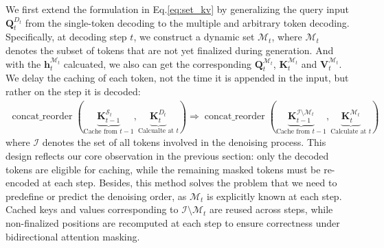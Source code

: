 \documentclass{article}
\newcommand{\bq}{\mathbf{Q}}
\begin{document}
We first extend the formulation in Eq.\ref{eq:set_kv} by generalizing the query input $\bq_t^{D_t}$ from the single-token decoding to the multiple and arbitrary token decoding. Specifically, at decoding step $t$, we construct a dynamic set $\mathcal{M}_t$, where $\mathcal{M}_t$ denotes the subset of tokens that are not yet finalized during generation. 
And with the $\mathbf{h}_t^{\mathcal{M}_t}$ calcuated, we also can get the corresponding $\mathbf{Q}_t^{\mathcal{M}_t}$, $\mathbf{K}_t^{\mathcal{M}_t}$ and $\mathbf{V}_t^{\mathcal{M}_t}$. We delay the caching of each token, not the time it is appended in the input, but rather on the step it is decoded:
\begin{align}
    \operatorname{concat\_reorder}\left(\right.\underbrace{\mathbf{K}_{t-1}^{\mathcal{S}_t}}_{\text{Cache from } t-1}, \underbrace{\mathbf{K}_t^{D_t}}_{\text{Calcualte at } t}\left.\right) \Rightarrow \operatorname{concat\_reorder}\left(\right.\underbrace{\mathbf{K}_{t-1}^{\mathcal{I}\setminus\mathcal{M}_t}}_{\text{Cache from } t-1}, \underbrace{\mathbf{K}_t^{\mathcal{M}_t}}_{\text{Calculate at } t}\left.\right) 
\end{align}
where $\mathcal{I}$ denotes the set of all tokens involved in the denoising process. This design reflects our core observation in the previous section: only the decoded tokens are eligible for caching, while the remaining masked tokens must be re-encoded at each step. Besides, this method solves the problem that we need to predefine or predict the denoising order, as $\mathcal{M}_t$ is explicitly known at each step.
Cached keys and values corresponding to $\mathcal{I}\setminus \mathcal{M}_t$ are reused across steps, while non-finalized positions are recomputed at each step to ensure correctness under bidirectional attention masking.
\end{document}

